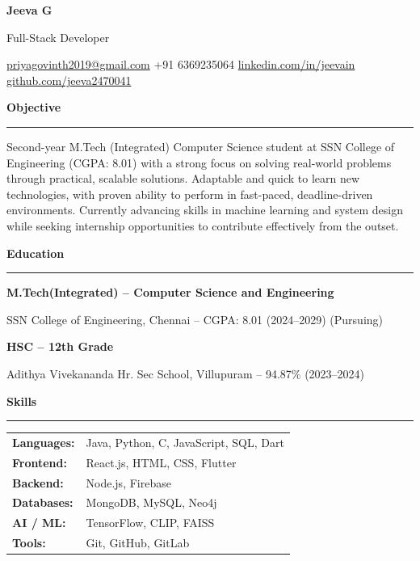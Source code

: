 \documentclass[12pt]{article}
\newcommand{\name}[1]{{\fontsize{20pt}{20pt}\selectfont\textbf{#1}}}
\newcommand{\sectionhead}[1]{{\fontsize{12pt}{14pt}\selectfont\textbf{#1}}\vspace{2pt}\hrule\vspace{3pt}}
\begin{document}
\begin{center}
    \name{Jeeva G}
    \vspace{2pt}

    {\fontsize{10.5pt}{10.5pt}\selectfont Full-Stack Developer}

    \vspace{2pt}

    \href{mailto:priyagovinth2019@gmail.com}{priyagovinth2019@gmail.com} \quad
    +91 6369235064 \quad
    \href{https://linkedin.com/in/jeevain/}{linkedin.com/in/jeevain} \quad
    \href{https://github.com/jeeva2470041}{github.com/jeeva2470041}
\end{center}

\vspace{3pt}

\sectionhead{Objective}

Second-year M.Tech (Integrated) Computer Science student at SSN College of Engineering (CGPA: 8.01) with a strong focus on solving real-world problems through practical, scalable solutions. Adaptable and quick to learn new technologies, with proven ability to perform in fast-paced, deadline-driven environments. Currently advancing skills in machine learning and system design while seeking internship opportunities to contribute effectively from the outset.

\vspace{4pt}

\sectionhead{Education}

\textbf{M.Tech(Integrated) -- Computer Science and Engineering} \hfill

SSN College of Engineering, Chennai -- CGPA: 8.01 (2024--2029) (Pursuing)

\textbf{HSC -- 12th Grade} \hfill

Adithya Vivekananda Hr. Sec School, Villupuram -- 94.87\% (2023--2024)

\vspace{4pt}

\sectionhead{Skills}

\begin{tabular}{ l l }
\textbf{Languages:} & Java, Python, C, JavaScript, SQL, Dart \\
\textbf{Frontend:} & React.js, HTML, CSS, Flutter \\
\textbf{Backend:} & Node.js, Firebase \\
\textbf{Databases:} & MongoDB, MySQL, Neo4j \\
\textbf{AI / ML:} & TensorFlow, CLIP, FAISS \\
\textbf{Tools:} & Git, GitHub, GitLab \\
\end{tabular}
\end{document}
